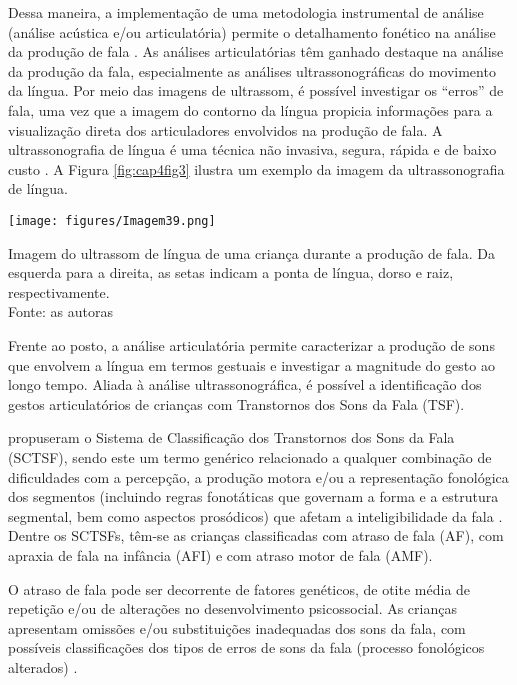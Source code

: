 \documentclass[output=paper,colorlinks,citecolor=brown,booklanguage=portuguese]{langscibook}
\begin{document}
Dessa maneira, a implementação de uma metodologia instrumental de análise (análise acústica e/ou articulatória) permite o detalhamento fonético na análise da produção de fala \citep{Albano2001}. As análises articulatórias têm ganhado destaque na análise da produção da fala, especialmente as análises ultrassonográficas do movimento da língua.  Por meio das imagens de ultrassom, é possível investigar os “erros” de fala, uma vez que a imagem do contorno da língua propicia informações para a visualização direta dos articuladores envolvidos na produção de fala. A ultrassonografia de língua é uma técnica não invasiva, segura, rápida e de baixo custo \citep{Wiethan2015, Cleland2015}. A Figura \ref{fig:cap4fig3} ilustra um exemplo da imagem da ultrassonografia de língua.





\begin{Figura}
    \texttt{[image: figures/Imagem39.png]}
    \caption{Imagem do ultrassom de língua de uma criança durante a produção de fala. Da esquerda para a direita, as setas indicam a ponta de língua, dorso e raiz, respectivamente.\\
    Fonte: as autoras}
    \label{fig:cap4fig3}
\end{Figura}



Frente ao posto, a análise articulatória permite caracterizar a produção de sons que envolvem a língua em termos gestuais e investigar a magnitude do gesto ao longo tempo. Aliada à análise ultrassonográfica, é possível a identificação dos gestos articulatórios de crianças com Transtornos dos Sons da Fala (TSF).

\citet{Shriberg2019a} propuseram o Sistema de Classificação dos Transtornos dos Sons da Fala (SCTSF), sendo este um termo genérico relacionado a qualquer combinação de dificuldades com a percepção, a produção motora e/ou a representação fonológica dos segmentos (incluindo regras fonotáticas que governam a forma e a estrutura segmental, bem como aspectos prosódicos) que afetam a inteligibilidade da fala \citep{ASHA2007, ASHA2017, Shriberg2019a}. Dentre os SCTSFs, têm-se as crianças classificadas com atraso de fala (AF), com apraxia de fala na infância (AFI) e com atraso motor de fala (AMF).

O atraso de fala pode ser decorrente de fatores genéticos, de otite média de repetição e/ou de alterações no desenvolvimento psicossocial. As crianças apresentam omissões e/ou substituições inadequadas dos sons da fala, com possíveis classificações dos tipos de erros de sons da fala (processo fonológicos alterados) \citep{Shriberg2019a}.
\end{document}
